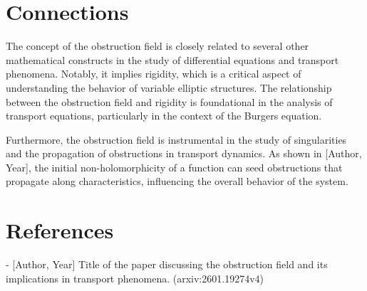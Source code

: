 \documentclass[11pt,a4paper]{article}
\begin{document}
\section{Connections}
The concept of the obstruction field is closely related to several other mathematical constructs in the study of differential equations and transport phenomena. Notably, it implies rigidity, which is a critical aspect of understanding the behavior of variable elliptic structures. The relationship between the obstruction field and rigidity is foundational in the analysis of transport equations, particularly in the context of the Burgers equation.

Furthermore, the obstruction field is instrumental in the study of singularities and the propagation of obstructions in transport dynamics. As shown in [Author, Year], the initial non-holomorphicity of a function can seed obstructions that propagate along characteristics, influencing the overall behavior of the system.

\section{References}
- [Author, Year] Title of the paper discussing the obstruction field and its implications in transport phenomena. (arxiv:2601.19274v4)
\end{document}
